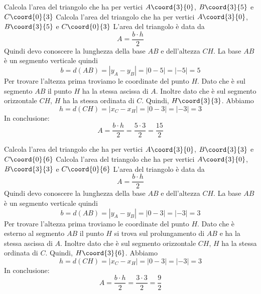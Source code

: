 \begin{exercise}
	Calcola l'area del triangolo che ha per vertici $A\coord{3}{0}$, $B\coord{3}{5}$ e $C\coord{0}{3}$
	\tcblower
	Calcola l'area del triangolo che ha per vertici $A\coord{3}{0}$, $B\coord{3}{5}$ e $C\coord{0}{3}$
	L'area del triangolo è data da \[A=\dfrac{b\cdot h}{2}\]
	Quindi devo conoscere la lunghezza della base $AB$ e dell'altezza $CH$.
	La base $AB$ è un segmento verticale quindi \[b=d(AB)=\left| y_A-y_B\right|=\left| 0-5\right|=\left|-5\right|=5   \]
	Per trovare l'altezza prima troviamo le coordinate del punto $H$. Dato che è sul segmento $AB$ il punto $H$ ha la stessa ascissa di $A$. Inoltre dato che è sul segmento orizzontale $CH$, $H$ ha la stessa ordinata di $C$. Quindi,  $H\coord{3}{3}$. Abbiamo \[h=d(CH)=\left| x_C-x_H\right|=\left| 0-3\right|=\left|-3\right|=3   \]In conclusione: \[A=\dfrac{b\cdot h}{2}=\dfrac{5\cdot 3}{2}=\dfrac{15}{2}\]
	\begin{center}
		
		\label{fig:AreaTriangolo3}
	\end{center}
\end{exercise}
\begin{exercise}
	Calcola l'area del triangolo che ha per vertici $A\coord{3}{0}$, $B\coord{3}{3}$ e $C\coord{0}{6}$
	\tcblower
		Calcola l'area del triangolo che ha per vertici $A\coord{3}{0}$, $B\coord{3}{3}$ e $C\coord{0}{6}$
	L'area del triangolo è data da \[A=\dfrac{b\cdot h}{2}\]
	Quindi devo conoscere la lunghezza della base $AB$ e dell'altezza $CH$.
	La base $AB$ è un segmento verticale quindi \[b=d(AB)=\left| y_A-y_B\right|=\left|0-3\right|=\left|-3\right|=3   \]
	Per trovare l'altezza prima troviamo le coordinate del punto $H$. Dato che è esterno al segmento $AB$ il punto $H$ si trova sul prolungamento di $AB$ e ha la stessa ascissa di $A$. Inoltre dato che è sul segmento orizzontale $CH$, $H$ ha la stessa ordinata di $C$. Quindi,  $H\coord{3}{6}$. Abbiamo \[h=d(CH)=\left| x_C-x_H\right|=\left| 0-3\right|=\left|-3\right|=3   \]In conclusione: \[A=\dfrac{b\cdot h}{2}=\dfrac{3\cdot 3}{2}=\dfrac{9}{2}\]
	\begin{center}
		
		\label{fig:AreaTriangolo4}
	\end{center}
\end{exercise}
